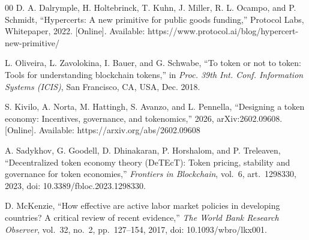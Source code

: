 \documentclass[conference]{IEEEtran}
\begin{document}
\begin{thebibliography}{00}
	 D. A. Dalrymple, H. Holtebrinck, T. Kuhn, J. Miller, R. L. Ocampo, and P. Schmidt, ``Hypercerts: A new primitive for public goods funding,'' Protocol Labs, Whitepaper, 2022. [Online]. Available: https://www.protocol.ai/blog/hypercert-new-primitive/

	 L. Oliveira, L. Zavolokina, I. Bauer, and G. Schwabe, ``To token or not to token: Tools for understanding blockchain tokens,'' in \emph{Proc. 39th Int. Conf. Information Systems (ICIS)}, San Francisco, CA, USA, Dec. 2018.

	 S. Kivilo, A. Norta, M. Hattingh, S. Avanzo, and L. Pennella, ``Designing a token economy: Incentives, governance, and tokenomics,'' 2026, arXiv:2602.09608. [Online]. Available: https://arxiv.org/abs/2602.09608

	 A. Sadykhov, G. Goodell, D. Dhinakaran, P. Horshalom, and P. Treleaven, ``Decentralized token economy theory (DeTEcT): Token pricing, stability and governance for token economies,'' \emph{Frontiers in Blockchain}, vol.~6, art.~1298330, 2023, doi: 10.3389/fbloc.2023.1298330.

	 D. McKenzie, ``How effective are active labor market policies in developing countries? A critical review of recent evidence,'' \emph{The World Bank Research Observer}, vol.~32, no.~2, pp.~127--154, 2017, doi: 10.1093/wbro/lkx001.

\end{thebibliography}
\vspace{12pt}
\end{document}
